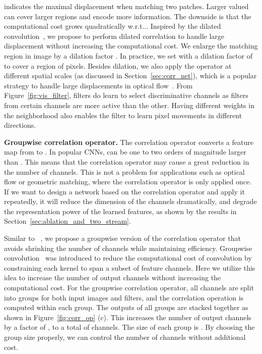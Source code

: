 \documentclass[10pt,twocolumn,letterpaper]{article}
\makeatletter
\DeclareRobustCommand\onedot{\futurelet\@let@token\@onedot}
\def\@onedot{\ifx\@let@token.\else.\null\fi\xspace}
\def\wrt{w.r.t\onedot} \def\dof{d.o.f\onedot}
\makeatother
\begin{document}
 indicates the maximal displacement when matching two patches. Larger valued  can cover larger regions and encode more information. The downside is that the computational cost grows quadratically \wrt . Inspired by the dilated convolution~\cite{yu2015multi}, we propose to perform dilated correlation to handle large displacement without increasing the computational cost. We enlarge the matching region in image  by a dilation factor .
In practice, we set  with a dilation factor of  to cover a region of  pixels. Besides dilation, we also apply the operator at different spatial scales (as discussed in Section~\ref{sec:corr_net}), which is a popular strategy to handle large displacements in optical flow~\cite{ranjan2017optical}. From Figure~\ref{fig:vis_filter}, filters do learn to select discriminative channels as filters from certain channels are more active than the other. Having different weights in the  neighborhood also enables the filter to learn pixel movements in different directions.

\noindent\textbf{Groupwise correlation operator.} The correlation operator converts a feature map from  to . In popular CNNs,  can be one to two orders of magnitude larger than . This means that the correlation operator 
may cause a great reduction in the number of channels.
This is not a problem for applications such as optical flow or geometric matching, where the correlation operator is only applied  once. If we  want to design a network based on the correlation operator and apply it repeatedly, it will reduce the dimension of the channels dramatically, and degrade the representation power of the learned features, as shown by the results in Section~\ref{sec:ablation_and_two_stream}.

Similar to ~\cite{guo2019group}, we propose a groupwise version of the correlation operator that avoids shrinking  the number of channels while maintaining efficiency. Groupwise convolution~\cite{Krizhevsky12,xie2017aggregated} was introduced to reduce the computational cost of convolution by constraining each kernel to span a  subset of feature channels.
Here we utilize this idea to increase the number of output channels without increasing the computational cost. For the groupwise correlation operator, all  channels are split into  groups for both input images and filters, and the correlation operation is computed within each group. The outputs of all groups are stacked together as shown in Figure~\ref{fig:corr_op} (c). This increases the number of output channels by a factor of , to a total of  channels. The size of each group is . By choosing the group size properly, we can control the number of channels without additional cost.
\end{document}

